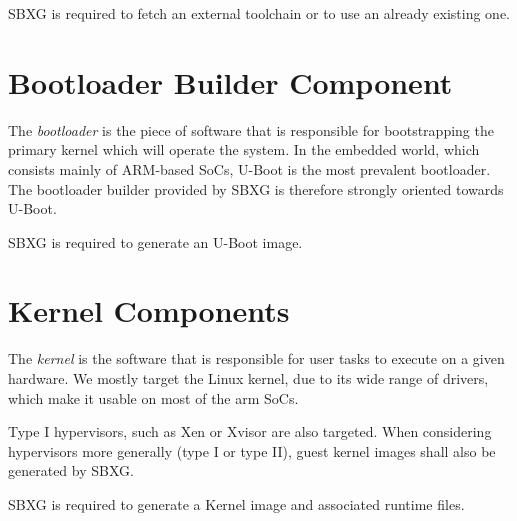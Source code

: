 \documentclass{article}
\begin{document}
\begin{requirement}
  SBXG is required to fetch an external toolchain or to use an already existing
  one.
\end{requirement}


\section{Bootloader Builder Component}

The \emph{bootloader} is the piece of software that is responsible for
bootstrapping the primary kernel which will operate the system. In the embedded
world, which consists mainly of ARM-based SoCs, U-Boot is the most prevalent
bootloader. The bootloader builder provided by SBXG is therefore strongly
oriented towards U-Boot.

\begin{center}
\end{center}

\begin{requirement}
SBXG is required to generate an U-Boot image.
\end{requirement}


\section{Kernel Components}

The \emph{kernel} is the software that is responsible for user tasks to execute
on a given hardware. We mostly target the Linux kernel, due to its wide range of
drivers, which make it usable on most of the arm SoCs.

Type I hypervisors, such as Xen or Xvisor are also targeted. When considering
hypervisors more generally (type I or type II), guest kernel images shall also
be generated by SBXG.

\begin{requirement}
SBXG is required to generate a Kernel image and associated runtime files.
\end{requirement}
\end{document}
